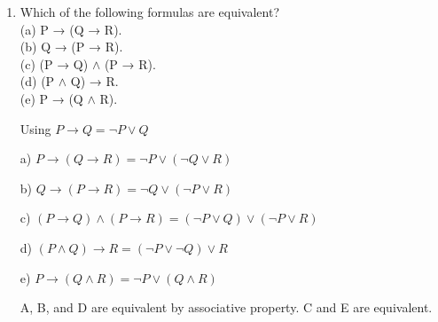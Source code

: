 \documentclass[12pt]{exam}
\begin{document}
\begin{enumerate}
\item Which of the following formulas are equivalent?
\\(a) P → (Q → R).
\\(b) Q → (P → R).
\\(c) (P → Q) $\land$ (P → R).
\\(d) (P $\land$ Q) → R.
\\(e) P → (Q $\land$ R).

Using $P \rightarrow Q = \lnot P \lor Q$

a) $P \rightarrow (Q \rightarrow R) = \lnot P \lor (\lnot Q \lor R)$

b) $Q \rightarrow (P \rightarrow R) = \lnot Q \lor (\lnot P \lor R)$

c) $(P \rightarrow Q) \land (P \rightarrow R) = (\lnot P \lor Q) \lor (\lnot P \lor R)$

d) $(P \land Q) \rightarrow R = (\lnot P \lor \lnot Q) \lor R$

e) $P \rightarrow (Q \land R) = \lnot P \lor (Q \land R)$

A, B, and D are equivalent by associative property.
C and E are equivalent.
\end{enumerate}
\end{document}
